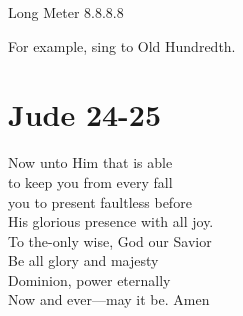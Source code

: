\documentclass{article}
\begin{document}
\noindent Long Meter 8.8.8.8

\noindent For example, sing to Old Hundredth.

\section*{Jude 24-25}

 Now unto Him that is able\\
to keep you from every fall\\
you to present faultless before\\
His glorious presence with all joy.\\

 To the-only wise, God our Savior\\
Be all glory and majesty\\
Dominion, power eternally\\
Now and ever---may it be. Amen\\
\end{document}
